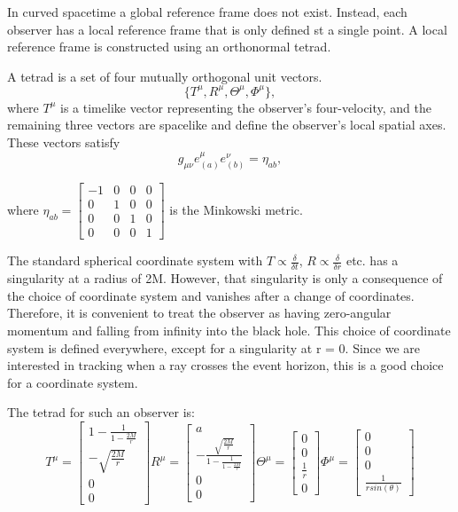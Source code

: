 \documentclass[11pt,a4paper,fleqn]{article}
\begin{document}
In curved spacetime a global reference frame does not exist. Instead, each observer has a local reference frame that is only defined st a single point. A local reference frame is constructed using an orthonormal tetrad.

A tetrad is a set of four mutually orthogonal unit vectors.
\[
\{ T^\mu, R^\mu, \Theta^\mu, \Phi^\mu \},
\]
where $T^\mu$ is a timelike vector representing the observer’s four-velocity, and the remaining three vectors are spacelike and define the observer’s local spatial axes. These vectors satisfy
\[
g_{\mu\nu} e_{(a)}^\mu e_{(b)}^\nu = \eta_{ab},
\]

where $\eta_{ab} = \begin{bmatrix}
  -1 &0 & 0 & 0 \\
   0&1 & 0 & 0 \\
  0 &0 & 1 & 0 \\
  0 &0 & 0 & 1
\end{bmatrix} $ is the Minkowski metric.

The standard spherical coordinate system with $T \propto \frac{\delta}{\delta t}$, $R \propto \frac{\delta}{\delta r}$ etc. has a singularity at a radius of 2M. However, that singularity is only a consequence of the choice of coordinate system and vanishes after a change of coordinates. Therefore, it is convenient to treat the observer as having zero-angular momentum and falling from infinity into the black hole. This choice of coordinate system is defined everywhere, except for a singularity at r = 0. Since we are interested in tracking when a ray crosses the event horizon, this is a good choice for a coordinate system.

The tetrad for such an observer is:
$$ T^\mu =\begin{bmatrix}
  1 - \frac{1}{1 - \frac{2M}{r}} \\
  - \sqrt{\frac{2M}{r}} \\
  0 \\
  0
\end{bmatrix} 
R^\mu =\begin{bmatrix}
  a \\
  -\frac{ \sqrt{ \frac{2M}{r} } } {1 - \frac{1}{1 - \frac{2M}{r} }} \\
  0 \\
  0
\end{bmatrix}
\Theta^\mu =\begin{bmatrix}
  0 \\
  0 \\
  \frac{1}{r} \\
  0 
\end{bmatrix}
\Phi^\mu = \begin{bmatrix}
  0 \\
  0 \\
  0\\
  \frac{1}{rsin(\theta)}
\end{bmatrix}$$
\end{document}
